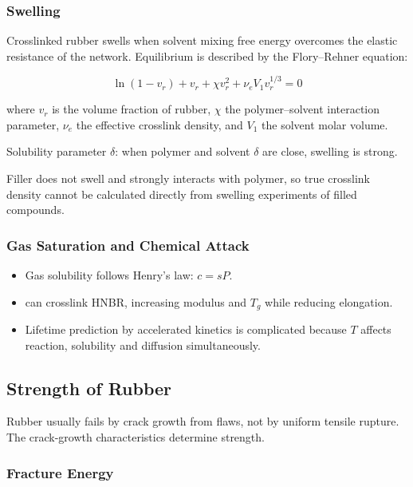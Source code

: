 \documentclass{NoteThesis/note-thesis}
\begin{document}
\subsubsection*{Swelling}

Crosslinked rubber swells when solvent mixing free energy overcomes the elastic resistance of the network. Equilibrium is described by the Flory--Rehner equation:

\[
\ln(1 - v_r) + v_r + \chi v_r^2 + \nu_e V_1 v_r^{1/3} = 0
\]

where $v_r$ is the volume fraction of rubber, $\chi$ the polymer--solvent interaction parameter, $\nu_e$ the effective crosslink density, and $V_1$ the solvent molar volume.

Solubility parameter $\delta$: when polymer and solvent $\delta$ are close, swelling is strong.

\begin{mynote_env}[frametitle={Effect of Filler}]
    Filler does not swell and strongly interacts with polymer, so true crosslink density cannot be calculated directly from swelling experiments of filled compounds.
\end{mynote_env}

\subsubsection*{Gas Saturation and Chemical Attack}

\begin{itemize}
    \item Gas solubility follows Henry's law: $c = sP$.
    \item {} can crosslink HNBR, increasing modulus and $T_g$ while reducing elongation.
    \item Lifetime prediction by accelerated kinetics is complicated because $T$ affects reaction, solubility and diffusion simultaneously.
\end{itemize}

\subsection{Strength of Rubber}

Rubber usually fails by crack growth from flaws, not by uniform tensile rupture. The crack-growth characteristics determine strength.

\subsubsection*{Fracture Energy}
\end{document}
